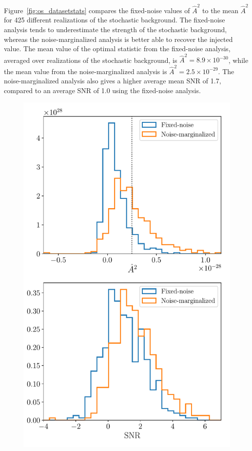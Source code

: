 \documentclass[twocolumn,aps,prd,superscriptaddress]{revtex4-1}
\begin{document}
Figure~\ref{fig:os_datasetstats} compares the fixed-noise values of $\hat{A}^2$ 
to the mean $\hat{A}^2$ for 425 different realizations of the stochastic background. 
The fixed-noise analysis tends to underestimate the strength of the stochastic background, 
whereas the noise-marginalized analysis is better able to recover the injected value. 
The mean value of the optimal statistic from the fixed-noise analysis, 
averaged over realizations of the stochastic background, is $\hat{A}^2 = 8.9 \times 10^{-30}$, 
while the mean value from the noise-marginalized analysis is $\hat{A}^2 = 2.5 \times 10^{-29}$. 
The noise-marginalized analysis also gives a higher average mean SNR of 1.7, 
compared to an average SNR of 1.0 using the fixed-noise analysis.
\begin{figure}[ht]
	\includegraphics[width=\columnwidth]{plots/os_datasetstats_5e-15.pdf}

\end{figure}
\end{document}

